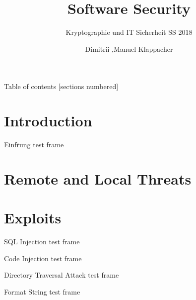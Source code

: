 \documentclass[10pt]{beamer}
\title{Software Security}
\subtitle{Kryptographie und IT Sicherheit SS 2018}
\date{}
\author{Dimitrii ,Manuel Klappacher}
\institute{Universit\"at Salzburg}
\begin{document}
\maketitle

\begin{frame}{Table of contents}
  [sections numbered]
  \tableofcontents[hideallsubsections]
\end{frame}


\section{Introduction}

\begin{frame}[fragile]{Einf\"rung}
  test frame
\end{frame}


\section{Remote and Local Threats}


\section{Exploits}
\begin{frame}[fragile]{SQL Injection}
  test frame
\end{frame}

\begin{frame}[fragile]{Code Injection}
  test frame
\end{frame}

\begin{frame}[fragile]{Directory Traversal Attack}
  test frame
\end{frame}

\begin{frame}[fragile]{Format String}
  test frame
\end{frame}
\end{document}
